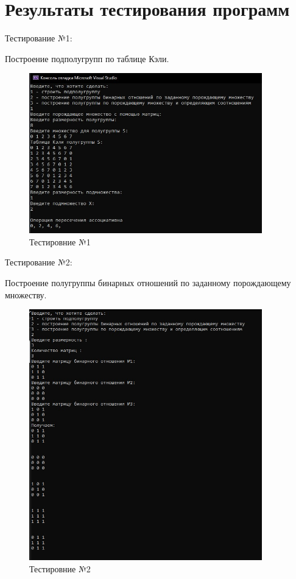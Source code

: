 \documentclass[bachelor, och, labwork]{shiza}
\begin{document}
	\section{Результаты тестирования программ}
	
	Тестирование №1:
	
Построение подполугрупп по таблице Кэли.

	\begin{figure}[H]
		\centering
		\includegraphics[width=0.9\textwidth]{test_1}
		\caption{Тестировние №1}
		\label{fig:test_1}
	\end{figure}
	
	Тестирование №2:
	
Построение полугруппы бинарных отношений по заданному порождающему множеству.
	
	\begin{figure}[H]
		\centering
		\includegraphics[width=0.9\textwidth]{test_2}
		\caption{Тестировние №2}
		\label{fig:test_2}
	\end{figure}
	
\end{document}
